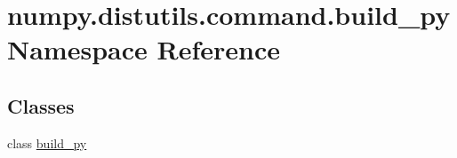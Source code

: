 \hypertarget{namespacenumpy_1_1distutils_1_1command_1_1build__py}{}\section{numpy.\+distutils.\+command.\+build\+\_\+py Namespace Reference}
\label{namespacenumpy_1_1distutils_1_1command_1_1build__py}
\subsection*{Classes}
\begin{DoxyCompactItemize}
\item 
class \hyperlink{classnumpy_1_1distutils_1_1command_1_1build__py_1_1build__py}{build\+\_\+py}
\end{DoxyCompactItemize}

